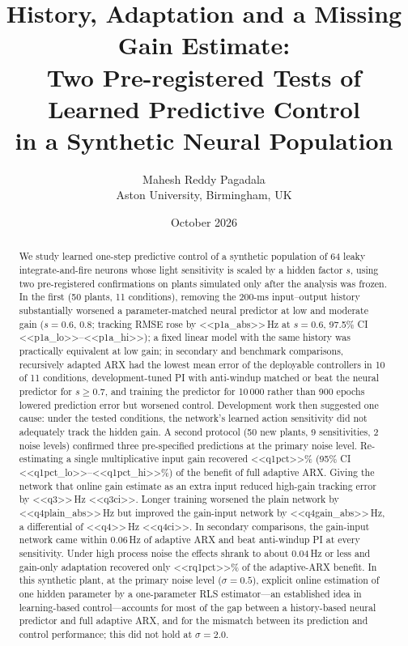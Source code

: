 \documentclass[11pt]{article}
\title{History, Adaptation and a Missing Gain Estimate:\\ Two Pre-registered Tests of Learned Predictive Control\\ in a Synthetic Neural Population}
\author{Mahesh Reddy Pagadala\\ \small Aston University, Birmingham, UK}
\date{October 2026}
\newcommand{\Hz}{\,Hz}
\begin{document}
\maketitle

\begin{abstract}
We study learned one-step predictive control of a synthetic population of 64 leaky integrate-and-fire neurons whose light sensitivity is scaled by a hidden factor $s$, using two pre-registered confirmations on plants simulated only after the analysis was frozen. In the first (50 plants, 11 conditions), removing the 200-ms input--output history substantially worsened a parameter-matched neural predictor at low and moderate gain ($s=0.6$, $0.8$; tracking RMSE rose by <<p1a_abs>>\Hz{} at $s=0.6$, 97.5\% CI <<p1a_lo>>--<<p1a_hi>>); a fixed linear model with the same history was practically equivalent at low gain; in secondary and benchmark comparisons, recursively adapted ARX had the lowest mean error of the deployable controllers in 10 of 11 conditions, development-tuned PI with anti-windup matched or beat the neural predictor for $s\ge0.7$, and training the predictor for 10\,000 rather than 900 epochs lowered prediction error but worsened control. Development work then suggested one cause: under the tested conditions, the network's learned action sensitivity did not adequately track the hidden gain. A second protocol (50 new plants, 9 sensitivities, 2 noise levels) confirmed three pre-specified predictions at the primary noise level. Re-estimating a single multiplicative input gain recovered <<q1pct>>\% (95\% CI <<q1pct_lo>>--<<q1pct_hi>>\%) of the benefit of full adaptive ARX. Giving the network that online gain estimate as an extra input reduced high-gain tracking error by <<q3>>\Hz{} <<q3ci>>. Longer training worsened the plain network by <<q4plain_abs>>\Hz{} but improved the gain-input network by <<q4gain_abs>>\Hz{}, a differential of <<q4>>\Hz{} <<q4ci>>. In secondary comparisons, the gain-input network came within 0.06\Hz{} of adaptive ARX and beat anti-windup PI at every sensitivity. Under high process noise the effects shrank to about 0.04\Hz{} or less and gain-only adaptation recovered only <<rq1pct>>\% of the adaptive-ARX benefit. In this synthetic plant, at the primary noise level ($\sigma=0.5$), explicit online estimation of one hidden parameter by a one-parameter RLS estimator---an established idea in learning-based control---accounts for most of the gap between a history-based neural predictor and full adaptive ARX, and for the mismatch between its prediction and control performance; this did not hold at $\sigma=2.0$.
\end{abstract}
\end{document}
